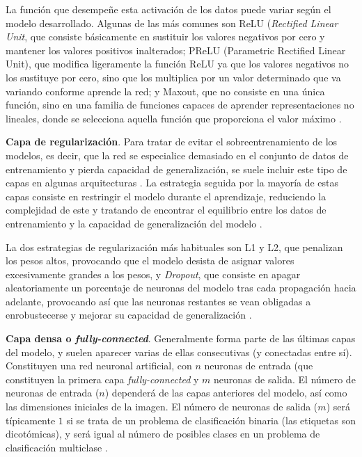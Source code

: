 La función que desempeñe esta activación de los datos puede variar según el modelo desarrollado. Algunas de las más comunes son ReLU (\textit{Rectified Linear Unit}, que consiste básicamente en sustituir los valores negativos por cero y mantener los valores positivos inalterados; PReLU (Parametric Rectified Linear Unit), que modifica ligeramente la función ReLU ya que los valores negativos no los sustituye por cero, sino que los multiplica por un valor determinado que va variando conforme aprende la red; y Maxout, que no consiste en una única función, sino en una familia de funciones capaces de aprender representaciones no lineales, donde se selecciona aquella función que proporciona el valor máximo \cite{cnn:gu, cnn:cheatsheet}.

\textbf{Capa de regularización}. Para tratar de evitar el sobreentrenamiento de los modelos, es decir, que la red se especialice demasiado en el conjunto de datos de entrenamiento y pierda capacidad de generalización, se suele incluir este tipo de capas en algunas arquitecturas \cite{cnn:gu}. La estrategia seguida por la mayoría de estas capas consiste en restringir el modelo durante el aprendizaje, reduciendo la complejidad de este y tratando de encontrar el equilibrio entre los datos de entrenamiento y la capacidad de generalización del modelo \cite{cnn:biblia_deeplearning}.

La dos estrategias de regularización más habituales son L1 y L2, que penalizan los pesos altos, provocando que el modelo desista de asignar valores excesivamente grandes a los pesos, y \textit{Dropout}, que consiste en apagar aleatoriamente un porcentaje de neuronas del modelo tras cada propagación hacia adelante, provocando así que las neuronas restantes se vean obligadas a enrobustecerse y mejorar su capacidad de generalización \cite{cnn:biblia_deeplearning}.

\textbf{Capa densa o \textit{fully-connected}}. Generalmente forma parte de las últimas capas del modelo, y suelen aparecer varias de ellas consecutivas (y conectadas entre sí). Constituyen una red neuronal artificial, con $n$ neuronas de entrada (que constituyen la primera capa \textit{fully-connected} y $m$ neuronas de salida. El número de neuronas de entrada ($n$) dependerá de las capas anteriores del modelo, así como las dimensiones iniciales de la imagen. El número de neuronas de salida ($m$) será típicamente $1$ si se trata de un problema de clasificación binaria (las etiquetas son dicotómicas), y será igual al número de posibles clases en un problema de clasificación multiclase \cite{cnn:ieee, cnn:osea}.

